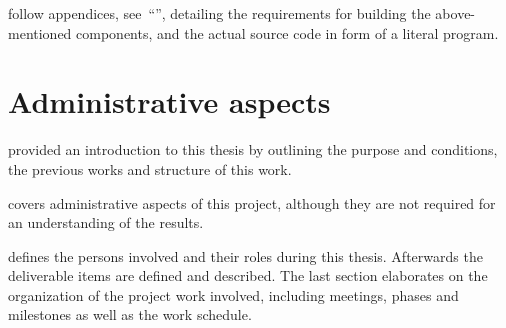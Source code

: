 \documentclass[%
    a4paper,    %
    justified,  %
    nobib,      %
    openany     %
]{tufte-book}
\makeatletter
\renewcommand{\label}[1]{\@tufte@label{##1}}%
\makeatother
\begin{document}
 follow appendices,
see~\enquote{}, detailing the requirements for building
the above-mentioned components, and the actual source code in form of a literal
program.

\chapter{Administrative aspects}
\label{chap:administrative-aspects}

 provided an introduction to this thesis by
outlining the purpose and conditions, the previous works and structure of this
work.

 covers administrative aspects of this project,
although they are not required for an understanding of the results.

 defines the persons involved and their roles
during this thesis. Afterwards the deliverable items are defined and described.
The last section elaborates on the organization of the project work involved,
including meetings, phases and milestones as well as the work schedule.
\end{document}
